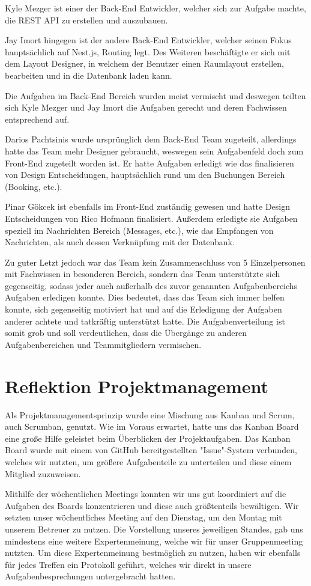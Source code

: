 Kyle Mezger ist einer der Back-End Entwickler, welcher sich zur Aufgabe machte, die REST API zu erstellen und auszubauen.

Jay Imort hingegen ist der andere Back-End Entwickler, welcher seinen Fokus hauptsächlich auf Nest.js, Routing legt.
Des Weiteren beschäftigte er sich mit dem Layout Designer, in welchem der Benutzer einen Raumlayout erstellen, bearbeiten und in die Datenbank laden kann.

Die Aufgaben im Back-End Bereich wurden meist vermischt und deswegen teilten sich Kyle Mezger und Jay Imort die Aufgaben gerecht und deren Fachwissen entsprechend auf.

Darios Pachtsinis wurde ursprünglich dem Back-End Team zugeteilt, allerdings hatte das Team mehr Designer gebraucht, weswegen sein Aufgabenfeld doch zum Front-End zugeteilt worden ist.
Er hatte Aufgaben erledigt wie das finalisieren von Design Entscheidungen, hauptsächlich rund um den Buchungen Bereich (Booking, etc.).

Pinar Gökcek ist ebenfalls im Front-End zuständig gewesen und hatte Design Entscheidungen von Rico Hofmann finalisiert.
Außerdem erledigte sie Aufgaben speziell im Nachrichten Bereich (Messages, etc.), wie das Empfangen von Nachrichten, als auch dessen Verknüpfung mit der Datenbank.

Zu guter Letzt jedoch war das Team kein Zusammenschluss von 5 Einzelpersonen mit Fachwissen in besonderen Bereich, sondern das Team unterstützte sich gegenseitig, sodass jeder auch außerhalb des zuvor genannten Aufgabenbereichs Aufgaben erledigen konnte.
Dies bedeutet, dass das Team sich immer helfen konnte, sich gegenseitig motiviert hat und auf die Erledigung der Aufgaben anderer achtete und tatkräftig unterstützt hatte.
Die Aufgabenverteilung ist somit grob und soll verdeutlichen, dass die Übergänge zu anderen Aufgabenbereichen und Teammitgliedern vermischen.

\section{Reflektion Projektmanagement}

Als Projektmanagementsprinzip wurde eine Mischung aus Kanban und Scrum, auch Scrumban, genutzt.
Wie im Voraus erwartet, hatte uns das Kanban Board eine große Hilfe geleistet beim Überblicken der Projektaufgaben.
Das Kanban Board wurde mit einem von GitHub bereitgestellten "Issue"-System verbunden, welches wir nutzten, um größere Aufgabenteile zu unterteilen und diese einem Mitglied zuzuweisen.

Mithilfe der wöchentlichen Meetings konnten wir uns gut koordiniert auf die Aufgaben des Boards konzentrieren und diese auch größtenteils bewältigen.
Wir setzten unser wöchentliches Meeting auf den Dienstag, um den Montag mit unserem Betreuer zu nutzen.
Die Vorstellung unseres jeweiligen Standes, gab uns mindestens eine weitere Expertenmeinung, welche wir für unser Gruppenmeeting nutzten.
Um diese Expertenmeinung bestmöglich zu nutzen, haben wir ebenfalls für jedes Treffen ein Protokoll geführt, welches wir direkt in unsere Aufgabenbesprechungen untergebracht hatten.


